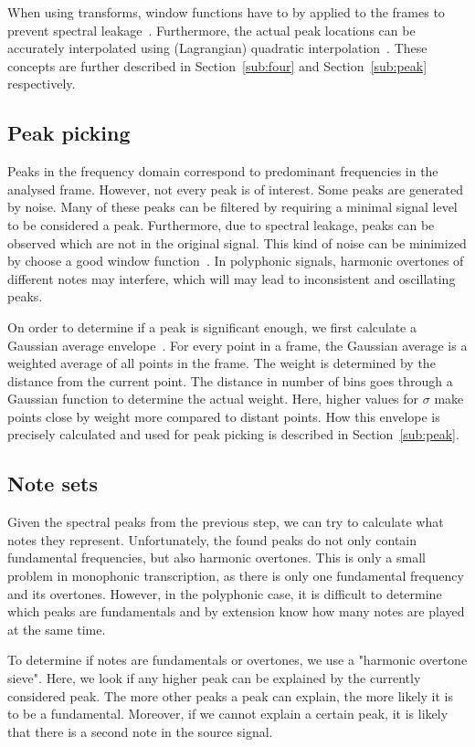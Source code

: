 \documentclass[10pt,twocolumn]{article}
\begin{document}
When using transforms, window functions have to by applied to the frames to prevent spectral leakage~\cite{window}. Furthermore, the actual peak locations can be accurately interpolated using (Lagrangian) quadratic interpolation~\cite{interpol}. These concepts are further described in Section~\ref{sub:four} and Section~\ref{sub:peak} respectively.

\subsection{Peak picking}
Peaks in the frequency domain correspond to predominant frequencies in the analysed frame. However, not every peak is of interest. Some peaks are generated by noise. Many of these peaks can be filtered by requiring a minimal signal level to be considered a peak. Furthermore, due to spectral leakage, peaks can be observed which are not in the original signal. This kind of noise can be minimized by choose a good window function~\cite{window}. In polyphonic signals, harmonic overtones of different notes may interfere, which will may lead to inconsistent and oscillating peaks.  %

On order to determine if a peak is significant enough, we first calculate a Gaussian average envelope~\cite{gauss}. For every point in a frame, the Gaussian average is a weighted average of all points in the frame. The weight is determined by the distance from the current point. The distance in number of bins goes through a Gaussian function to determine the actual weight. Here, higher values for $\sigma$ make points close by weight more compared to distant points. How this envelope is precisely calculated and used for peak picking is described in Section~\ref{sub:peak}.

\subsection{Note sets}
Given the spectral peaks from the previous step, we can try to calculate what notes they represent. Unfortunately, the found peaks do not only contain fundamental frequencies, but also harmonic overtones. This is only a small problem in monophonic transcription, as there is only one fundamental frequency and its overtones. However, in the polyphonic case, it is difficult to determine which peaks are fundamentals and by extension know how many notes are played at the same time.

To determine if notes are fundamentals or overtones, we use a "harmonic overtone sieve". Here, we look if any higher peak can be explained by the currently considered peak. The more other peaks a peak can explain, the more likely it is to be a fundamental. Moreover, if we cannot explain a certain peak, it is likely that there is a second note in the source signal.
\end{document}

